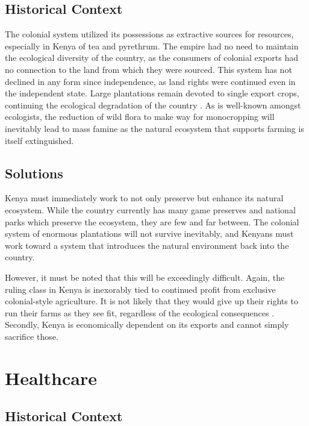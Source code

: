 \documentclass[american]{../../../coursework}
\begin{document}
\subsection{Historical Context}

The colonial system utilized its possessions as extractive sources for
resources, especially in Kenya of tea and pyrethrum. The empire had no need to
maintain the ecological diversity of the country, as the consumers of colonial
exports had no connection to the land from which they were sourced. This
system has not declined in any form since independence, as land rights were
continued even in the independent state. Large plantations remain devoted to
single export crops, continuing the ecological degradation of the country
\parencite{Syagga2006}. As is well-known amongst ecologists, the reduction of
wild flora to make way for monocropping will inevitably lead to mass famine as
the natural ecosystem that supports farming is itself extinguished.

\subsection{Solutions}

Kenya must immediately work to not only preserve but enhance its natural
ecosystem. While the country currently has many game preserves and national
parks which preserve the ecosystem, they are few and far between. The colonial
system of enormous plantations will not survive inevitably, and Kenyans must
work toward a system that introduces the natural environment back into the
country.

However, it must be noted that this will be exceedingly difficult. Again, the
ruling class in Kenya is inexorably tied to continued profit from exclusive
colonial-style agriculture. It is not likely that they would give up their
rights to run their farms as they see fit, regardless of the ecological
consequences \parencite{Berg-Schlosser1982}. Secondly, Kenya is economically
dependent on its exports and cannot simply sacrifice those.

\section{Healthcare}
\subsection{Historical Context}
\end{document}

